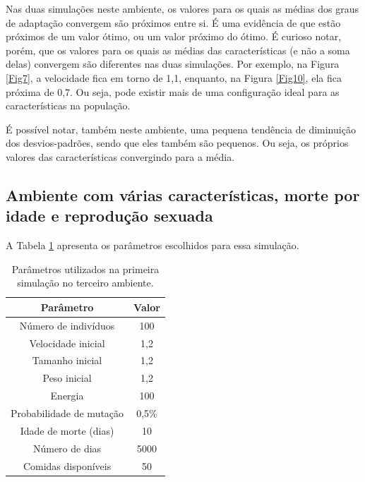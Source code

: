 \documentclass[10pt,brazil,english]{article}
\begin{document}
            Nas duas simulações neste ambiente, os valores para os quais as médias dos graus de adaptação convergem são próximos entre si. É uma evidência de que estão próximos de um valor ótimo, ou um valor próximo do ótimo. É curioso notar, porém, que os valores para os quais as médias das características (e não a soma delas) convergem são diferentes nas duas simulações. Por exemplo, na Figura \ref{Fig7}, a velocidade fica em torno de 1,1, enquanto, na Figura \ref{Fig10}, ela fica próxima de 0,7. Ou seja, pode existir mais de uma configuração ideal para as características na população.
            
            É possível notar, também neste ambiente, uma pequena tendência de diminuição dos desvios-padrões, sendo que eles também são pequenos. Ou seja, os próprios valores das características convergindo para a média.
        
        \subsection{Ambiente com várias características, morte por idade e reprodução sexuada}
        
            A Tabela \ref{Tab5} apresenta os parâmetros escolhidos para essa simulação.
            
            \begin{table}[!hbtp]
                \centering
                \caption{Parâmetros utilizados na primeira simulação no terceiro ambiente.}
                \label{Tab5}
                \begin{tabular}{c|c}
                    \hline
                    \textbf{Parâmetro}          & \textbf{Valor}    \\ \hline
                    Número de indivíduos        & 100               \\ \hline
                    Velocidade inicial          & 1,2               \\ \hline
                    Tamanho inicial             & 1,2               \\ \hline
                    Peso inicial                & 1,2               \\ \hline
                    Energia                     & 100               \\ \hline
                    Probabilidade de mutação    & 0,5\%             \\ \hline
                    Idade de morte (dias)       & 10                \\ \hline
                    Número de dias              & 5000              \\ \hline
                    Comidas disponíveis         & 50                \\ \hline
                \end{tabular}
            \end{table}
            
\end{document}
